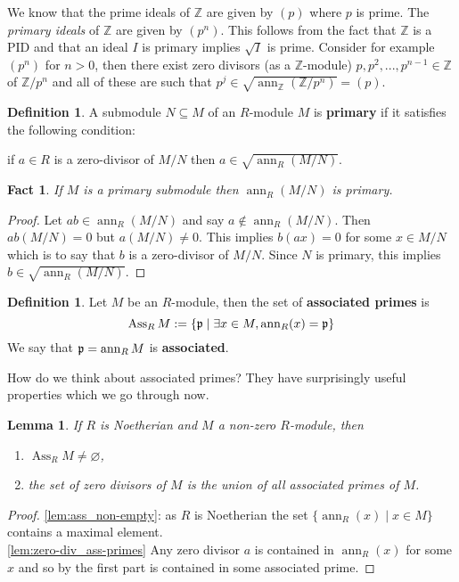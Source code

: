 \documentclass[12pt]{article}
\theoremstyle{plain}
\newtheorem{lemma}[thm]{Lemma}
\newtheorem{fact}[thm]{Fact}
\theoremstyle{definition}
\newtheorem{defn}[thm]{Definition} %
\newcommand{\bb}[1]{\mathbb{#1}}
\begin{document}
	We know that the prime ideals of $\bb{Z}$ are given by $(p)$ where $p$ is prime. The \emph{primary ideals} of $\bb{Z}$ are given by $(p^n)$. This follows from the fact that $\bb{Z}$ is a PID and that an ideal $I$ is primary implies $\sqrt{I}$ is prime. Consider for example $(p^n)$ for $n > 0$, then there exist zero divisors (as a $\bb{Z}$-module) $p,p^2,...,p^{n-1} \in \bb{Z}$ of $\bb{Z}/p^n$ and all of these are such that $p^j \in \sqrt{\operatorname{ann}_\bb{Z}(\bb{Z}/p^n)} = (p)$.
	\begin{defn}
		A submodule $N \subseteq M$ of an $R$-module $M$ is \textbf{primary} if it satisfies the following condition:
		
		if $a \in R$ is a zero-divisor of $M/N$ then $a \in \sqrt{\operatorname{ann}_R(M/N)}$.
	\end{defn}
	\begin{fact}
		If $M$ is a primary submodule then $\operatorname{ann}_R(M/N)$ is primary.
	\end{fact}
	\begin{proof}
		Let $ab \in \operatorname{ann}_R(M/N)$ and say $a \not\in \operatorname{ann}_R(M/N)$. Then $ab(M/N) = 0$ but $a(M/N) \neq 0$. This implies $b(ax) = 0$ for some $x \in M/N$ which is to say that $b$ is a zero-divisor of $M/N$. Since $N$ is primary, this implies $b \in \sqrt{\operatorname{ann}_R(M/N)}$.
	\end{proof}
	\begin{defn}
		Let $M$ be an $R$-module, then the set of \textbf{associated primes} is \[\operatorname{Ass}_RM := \lbrace \frak{p} \mid \exists x \in M, \operatorname{ann}_R(x) = \frak{p}\rbrace\]
		We say that $\frak{p} = \operatorname{ann}_RM$ is \textbf{associated}.
	\end{defn}
	How do we think about associated primes? They have surprisingly useful properties which we go through now.
	\begin{lemma}
		\label{lem:ass_nonempty_zero_div}
		If $R$ is Noetherian and $M$ a non-zero $R$-module, then
		\begin{enumerate}
			\item\label{lem:ass_non-empty} $\operatorname{Ass}_RM \neq \varnothing$,
			\item\label{lem:zero-div_ass-primes} the set of zero divisors of $M$ is the union of all associated primes of $M$.
		\end{enumerate}
	\end{lemma}
	\begin{proof}
		\eqref{lem:ass_non-empty}: as $R$ is Noetherian the set $\lbrace \operatorname{ann}_R(x) \mid x \in M\rbrace$ contains a maximal element.\\
		\eqref{lem:zero-div_ass-primes} Any zero divisor $a$ is contained in $\operatorname{ann}_R(x)$ for some $x$ and so by the first part is contained in some associated prime.
	\end{proof}
\end{document}
